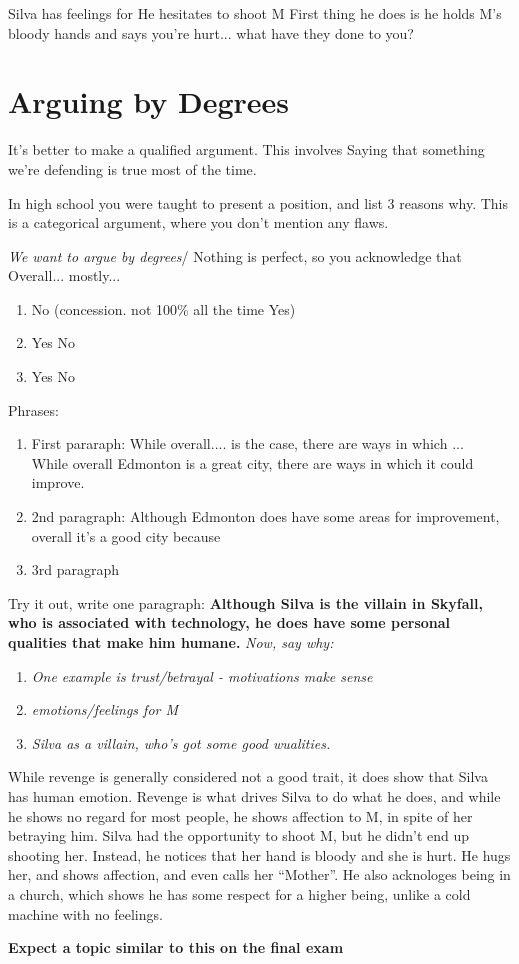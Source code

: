 \documentclass{article}
\begin{document}
    Silva has feelings for
    He hesitates to shoot M
    First thing he does is he holds M's bloody hands and says you're hurt... what have they done to you?

    \section{Arguing by Degrees}

    It's better to make a qualified argument. This involves
    Saying that something we're defending is true most of the time.

    In high school you were taught to present a position, and list 3 reasons why.
    This is a categorical argument, where you don't mention any flaws.


    \textit{We want to argue by degrees}/ Nothing is perfect, so you acknowledge that
    Overall... mostly...
    \begin{enumerate}
      \item No (concession. not 100\% all the time Yes)
      \item Yes No
      \item Yes No
    \end{enumerate}
    Phrases:
    \begin{enumerate}
      \item First pararaph: While overall.... is the case, there are ways in which ...\\
            While overall Edmonton is a great city, there are ways in which it could improve.
      \item  2nd paragraph: Although Edmonton does have some areas for improvement, overall it's a good city because
      \item 3rd paragraph
    \end{enumerate}

    Try it out, write one paragraph: \textbf{Although Silva is the villain in Skyfall, who is associated with technology, he does
    have some personal qualities that make him humane.}
    \textit{Now, say why: }
    \begin{enumerate}
      \item \textit{One example is trust/betrayal - motivations make sense}
      \item \textit{emotions/feelings for M}
      \item \textit{Silva as a villain, who's got some good wualities.}
    \end{enumerate}

    While revenge is generally considered not a good trait, it does show that Silva has human emotion.
    Revenge is what drives Silva to do what he does, and while he shows no regard for most people,
    he shows affection to M, in spite of her betraying him. Silva had the opportunity to shoot M,
    but he didn't end up shooting her. Instead, he notices that her hand is bloody and she is hurt.
    He hugs her, and shows affection, and even calls her ``Mother''. He also acknologes being in a church,
    which shows he has some respect for a higher being, unlike a cold machine with no feelings.

    \textbf{Expect a topic similar to this on the final exam}
\end{document}
